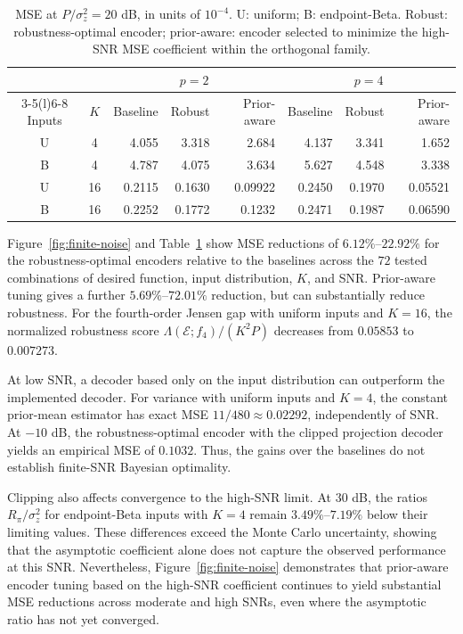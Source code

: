 \documentclass[journal,12pt,onecolumn,draftclsnofoot]{IEEEtran}
\newcommand{\enc}{\mathscr{E}}\newcommand{\dec}{\mathscr{D}}\newcommand{\R}{\mathbb R}\newcommand{\C}{\mathbb C}
\begin{document}


\begin{table}[t]
\caption{MSE at $P/\sigma_z^2=20$ dB, in units of $10^{-4}$. U: uniform; B: endpoint-Beta. Robust: robustness-optimal encoder; prior-aware: encoder selected to minimize the high-SNR MSE coefficient within the orthogonal family.}
\label{tab:finite-noise}
\centering\small
\setlength{\tabcolsep}{5pt}
\begin{tabular}{@{}ccrrrrrr@{}}\toprule
 & & \multicolumn{3}{c}{$p=2$} & \multicolumn{3}{c}{$p=4$}\\
\cmidrule(lr){3-5}\cmidrule(l){6-8}
Inputs & $K$ & Baseline & Robust & Prior-aware & Baseline & Robust & Prior-aware\\\midrule
U & 4  & 4.055 & 3.318 & 2.684 & 4.137 & 3.341 & 1.652\\
B & 4  & 4.787 & 4.075 & 3.634 & 5.627 & 4.548 & 3.338\\
U & 16 & 0.2115 & 0.1630 & 0.09922 & 0.2450 & 0.1970 & 0.05521\\
B & 16 & 0.2252 & 0.1772 & 0.1232 & 0.2471 & 0.1987 & 0.06590\\\bottomrule
\end{tabular}
\end{table}



Figure~\ref{fig:finite-noise} and Table~\ref{tab:finite-noise}
show MSE reductions of $6.12\%$--$22.92\%$ for the robustness-optimal
encoders relative to the baselines across the $72$ tested
combinations of desired function, input distribution, $K$, and SNR. Prior-aware tuning gives a further $5.69\%$--$72.01\%$
reduction, but can substantially reduce robustness. For the
fourth-order Jensen gap with uniform inputs and $K=16$, the
normalized robustness score $\Lambda(\enc;f_4)/(K^2P)$ decreases from $0.05853$ to $0.007273$.

At low SNR, a decoder based only on the input distribution can
outperform the implemented decoder. For variance with uniform
inputs and $K=4$, the constant prior-mean estimator has exact MSE $11/480\approx0.02292$, independently of SNR. At $-10$ dB, the robustness-optimal encoder with the clipped projection decoder yields an empirical MSE of $0.1032$. Thus, the gains over the
baselines do not establish finite-SNR Bayesian optimality.

Clipping also affects convergence to the high-SNR limit. At
$30$ dB, the ratios $R_\pi/\sigma_z^2$ for endpoint-Beta inputs
with $K=4$ remain $3.49\%$--$7.19\%$ below their limiting values.
These differences exceed the Monte Carlo uncertainty, showing
that the asymptotic coefficient alone does not capture the
observed performance at this SNR. Nevertheless, Figure~\ref{fig:finite-noise} demonstrates that prior-aware encoder tuning based on the high-SNR coefficient continues to yield substantial MSE reductions across moderate and high SNRs, even where the asymptotic ratio has not yet converged.
\end{document}
